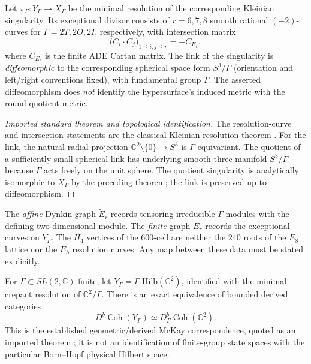 \documentclass[11pt]{article}
\begin{document}
\begin{theorem}
\label{p1b:thm:v12-resolution-link}
Let $\pi_\Gamma:Y_\Gamma\to X_\Gamma$ be the minimal resolution
of the corresponding Kleinian singularity.  Its exceptional divisor
consists of $r=6,7,8$ smooth rational $(-2)$-curves for
$\Gamma=2T,2O,2I$, respectively, with intersection matrix
\[
   \bigl(C_i\cdot C_j\bigr)_{1\leq i,j\leq r}=-C_{E_r},
\]
where $C_{E_r}$ is the finite ADE Cartan matrix.  The link of the
singularity is \emph{diffeomorphic} to the corresponding spherical
space form $S^3/\Gamma$ (orientation and left/right conventions fixed),
with fundamental group $\Gamma$.  The asserted diffeomorphism does
\emph{not} identify the hypersurface's induced metric with the round
quotient metric.
\end{theorem}
\begin{proof}[Imported standard theorem and topological identification]
The resolution-curve and intersection statements are the classical
Kleinian resolution theorem \cite{Slodowy1980,
BertschGyengeSzendroi2024Kleinian}.  For the link, the natural
radial projection $\mathbb C^2\setminus\{0\}\to S^3$ is
$\Gamma$-equivariant.  The quotient of a sufficiently small
spherical link has underlying smooth three-manifold $S^3/\Gamma$
because $\Gamma$ acts freely on the unit sphere.  The quotient
singularity is analytically isomorphic to $X_\Gamma$ by the
preceding theorem; the link is preserved up to diffeomorphism.
\end{proof}

\begin{remark}
\label{p1b:rem:v12-ade-type-separation}
The \emph{affine} Dynkin graph $\widetilde E_r$ records tensoring
irreducible $\Gamma$-modules with the defining two-dimensional
module.  The \emph{finite} graph $E_r$ records the exceptional curves
on $Y_\Gamma$.  The $H_4$ vertices of the $600$-cell are neither the
$240$ roots of the $E_8$ lattice nor the $E_8$ resolution curves.
Any map between these data must be stated explicitly.
\end{remark}

\begin{theorem}
\label{p1b:thm:v12-derived-mckay}
For $\Gamma\subset SL(2,\mathbb C)$ finite, let
$Y_\Gamma=\Gamma\text{-Hilb}(\mathbb C^2)$, identified with the
minimal crepant resolution of $\mathbb C^2/\Gamma$.  There is an
exact equivalence of bounded derived categories
\[
  D^b\!\operatorname{Coh}(Y_\Gamma)
   \simeq D^b_\Gamma\!\operatorname{Coh}(\mathbb C^2).
\]
This is the established geometric/derived McKay correspondence,
quoted as an imported theorem \cite{BridgelandKingReid2001,
BertschGyengeSzendroi2024Kleinian}; it is not an identification of
finite-group state spaces with the particular Born--Hopf physical
Hilbert space.
\end{theorem}
\end{document}
